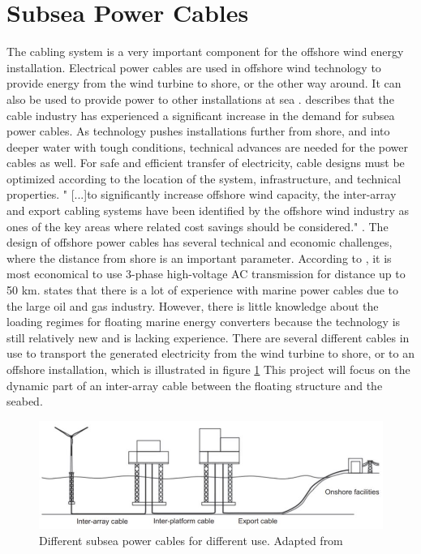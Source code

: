 \section{Subsea Power Cables}
 The cabling system is a very important component for the offshore wind energy installation. Electrical power cables are used in offshore wind technology to provide energy from the wind turbine to shore, or the other way around. It can also be used to provide power to other installations at sea \cite{Nasution2013}.  \cite{srinil2016} describes that the cable industry has experienced a significant increase in the demand for subsea power cables. As technology pushes installations further from shore, and into deeper water with tough conditions, technical advances are needed for the power cables as well. For safe and efficient transfer of electricity, cable designs must be optimized according to the location of the system, infrastructure, and technical properties. " [...]to significantly increase offshore wind capacity, the inter-array and export cabling systems have been identified by the offshore wind industry as ones of the key areas where related cost savings should be considered."  \cite{srinil2016}. The design of offshore power cables has several technical and economic challenges, where the distance from shore is an important parameter. According to \cite{Lynn2011}, it is most economical to use 3-phase high-voltage AC transmission for distance up to 50 km.\newline
 \newline
 \cite{Thies2012} states that there is a lot of experience with marine power cables due to the large oil and gas industry. However, there is little knowledge about the loading regimes for floating marine energy converters because the technology is still relatively new and is lacking experience. 
 \newline
 \newline
 There are several different cables in use to transport the generated electricity from the wind turbine to shore, or to an offshore installation, which is illustrated in figure \ref{fig:diffcable} This project will focus on the dynamic part of an inter-array cable between the floating structure and the seabed. 
 
 \begin{figure}[H]
\centering
\includegraphics[scale=0.8]{figures/diffcable}
\caption[$\; \:$Different subsea power cable]{Different subsea power cables for different use. Adapted from   \cite{srinil2016} }
 \label{fig:diffcable}
\end{figure}

